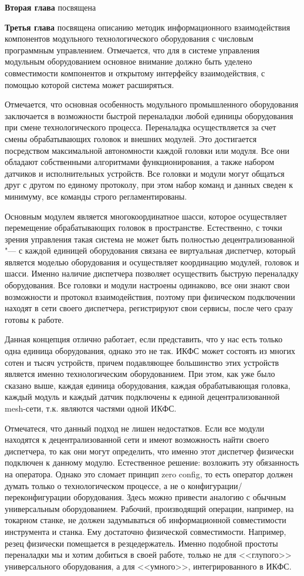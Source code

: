 \textbf{Вторая глава} посвящена

\textbf{Третья глава} посвящена описанию методик информационного взаимодействия компонентов модульного технологического оборудования с числовым программным управлением. Отмечается, что для в системе управления модульным оборудованием основное внимание должно быть уделено совместимости компонентов и открытому интерфейсу взаимодействия, с помощью которой система может расширяться. 

Отмечается, что основная особенность модульного промышленного оборудования заключается в возможности быстрой переналадки любой единицы оборудования при смене технологического процесса. Переналадка осуществляется за счет смены обрабатывающих головок и внешних модулей.  Это достигается посредством максимальной автономности каждой головки или модуля. Все они обладают собственными алгоритмами функционирования, а также набором датчиков и исполнительных устройств. Все головки и модули могут общаться друг с другом по единому протоколу, при этом набор команд и данных сведен к минимуму, все команды строго регламентированы.

Основным модулем является многокоординатное шасси, которое осуществляет перемещение обрабатывающих головок в пространстве. Естественно, с точки зрения управления такая система не может быть полностью децентрализованной "--- с каждой единицей оборудования связана ее виртуальная диспетчер, который является моделью оборудования и осуществляет координацию модулей, головок и шасси. Именно наличие диспетчера позволяет осуществить быструю переналадку оборудования. Все головки и модули настроены одинаково, все они знают свои возможности и протокол взаимодействия, поэтому при физическом подключении находят в сети своего диспетчера, регистрируют свои сервисы, после чего сразу готовы к работе.

Данная концепция отлично работает, если представить, что у нас есть только одна единица оборудования, однако это не так. ИКФС может состоять из многих сотен и тысяч устройств, причем подавляющее большинство этих устройств является именно технологическим оборудованием. При этом, как уже было сказано выше, каждая единица оборудования, каждая обрабатывающая головка, каждый модуль и каждый датчик подключены к единой децентрализованной mesh-сети, т.\:к. являются частями одной ИКФС.

Отмечатеся, что данный подход не лишен недостатков. Если все модули находятся к децентрализованной сети и имеют возможность найти своего диспетчера, то как они могут определить, что именно этот диспетчер физически подключен к данному модулю. Естественное решение: возложить эту обязанность на оператора. Однако это сломает принцип zero config, то есть оператор должен думать только о технологическом процессе, а не о конфигурации/переконфигурации оборудования. Здесь можно привести аналогию с обычным универсальным оборудованием. Рабочий, производящий операции, например, на токарном станке, не должен задумываться об информационной совместимости инструмента и станка. Ему достаточно физической совместимости. Например, резец физически помещается в резцедержатель. Именно подобной простоты переналадки мы и хотим добиться в своей работе, только не для <<глупого>> универсального оборудования, а для <<умного>>, интегрированного в ИКФС.

